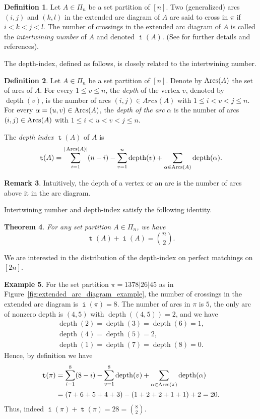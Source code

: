 \documentclass[11pt]{amsart}
\numberwithin{figure}{section}
\DeclareMathOperator{\depth}{depth}
\DeclareMathOperator{\arcs}{\text Arcs}
\DeclareMathOperator{\inumber}{\mathtt i}
\DeclareMathOperator{\dindex}{\mathtt t}
\theoremstyle{plain}
\newtheorem{theorem}{Theorem}[section]
\theoremstyle{definition}
\newtheorem{definition}[theorem]{Definition}
\newtheorem{example}[theorem]{Example}
\newtheorem{remark}[theorem]{Remark}
\begin{document}
\begin{definition}\label{defn:intertwining_number}
Let $A\in\Pi_n$ be a set partition of $[n]$. Two (generalized) arcs $(i,j)$ and $(k,l)$ in the extended arc diagram of $A$ are said to cross in $\pi$ if $i < k < j < l$. The number of crossings in the extended arc diagram of $A$ is called the {\em intertwining number} of $A$ and denoted $\inumber(A)$. (See \cite{GeometricInterpretationIntertwiningNumber} for further details and references). 
\end{definition}
	
The depth-index, defined as follows, is closely related to the intertwining number.
	
\begin{definition}\label{definition:depth_index}
Let $A\in\Pi_n$ be a set partition of $[n]$. Denote by $\arcs(A)$ the set of arcs of $A$. For every $1\leq v \leq n$, the {\em depth} of the vertex $v$, denoted by $\depth(v)$, is the number of arcs $(i,j)\in Arcs(A)$ with $1\leq i < v < j \leq n$. For every $\alpha=(u,v) \in \arcs(A)$, the {\em depth of the arc} $\alpha$ is the number of arcs $(i,j)\in\arcs(A)$ with $1\leq i < u < v < j \leq n$.
		
The {\em depth index} $\dindex(A)$ of $A$ is  
$$
\dindex(A)=\sum_{i=1}^{|\arcs(A)|}(n-i)-\sum_{v=1}^n \depth(v) + \sum_{\alpha \in \arcs(A)} \depth(\alpha).
$$ 
\end{definition}

\begin{remark}
Intuitively, the depth of a vertex or an arc is the number of arcs above it in the arc diagram.
\end{remark}
	
Intertwining number and depth-index satisfy the following identity.
\begin{theorem}\cite[Theorem~1]{GeometricInterpretationIntertwiningNumber}\label{thm:dindex_inumber_sum}
For any set partition $A\in\Pi_n$, we have $$\dindex(A)+\inumber(A)=\binom{n}{2}.$$
\end{theorem}
	
We are interested in the distribution of the depth-index on perfect matchings on $[2n]$.
\begin{example}
For the set partition $\pi=1378|26|45$ as in Figure~\ref{fig:extended_arc_diagram_example}, the number of crossings in the extended arc diagram is $\inumber(\pi)=8$. 
The number of arcs in $\pi$ is $5$, the only arc of nonzero depth is $(4,5)$ with $\depth((4,5))=2$, and we have 
\begin{align*}
\depth(2)=\depth(3)=\depth(6) = 1,\\ \depth(4)=\depth(5)=2,\\ \depth(1)=\depth(7)=\depth(8)=0.
\end{align*}
Hence, by definition we have 
\begin{align*}
    \dindex(\pi) 
    &= \sum_{i=1}^8 (8-i)-\sum_{v=1}^{8}\depth(v)+ \sum_{\alpha\in\arcs(\pi)}\depth(\alpha) \\
    &= (7+6+5+4+3) - (1 + 2+ 2+1+ 1) + 2= 20.
\end{align*}
Thus, indeed $\inumber(\pi)+\dindex(\pi)=28=\binom{8}{2}$.
\end{example}
\end{document}
